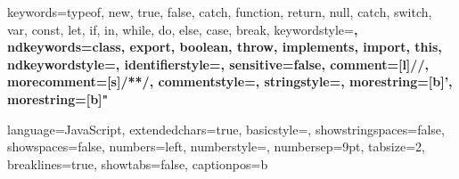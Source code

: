 {
  keywords={typeof, new, true, false, catch, function, return, null, catch, switch, var, const, let, if, in, while, do, else, case, break},
  keywordstyle=\color{myblue}\bfseries,
  ndkeywords={class, export, boolean, throw, implements, import, this},
  ndkeywordstyle=\color{darkgray}\bfseries,
  identifierstyle=\color{black},
  sensitive=false,
  comment=[l]{//},
  morecomment=[s]{/*}{*/},
  commentstyle=\color{mygreen}\ttfamily,
  stringstyle=\color{red}\ttfamily,
  morestring=[b]',
  morestring=[b]"
}




\lstset
{
   language=JavaScript,
   extendedchars=true,
   basicstyle=\footnotesize\listingsttfamily,
   showstringspaces=false,
   showspaces=false,
   numbers=left,
   numberstyle=\footnotesize,
   numbersep=9pt,
   tabsize=2,
   breaklines=true,
   showtabs=false,
   captionpos=b
}


\renewcommand\theFancyVerbLine{\footnotesize\arabic{FancyVerbLine}}
\newcommand{\inputmintedtesi}[3]{
    \begin{listing}[H]
      \inputminted[frame=single, %
                   framerule=0.0pt, %
                   rulecolor=mygray, %
                   framesep=2mm, %
                   baselinestretch=1.3, %
                   style=emacs, %
                   bgcolor=backcolor, %
                   fontfamily=courier, %
                   fontsize=\footnotesize, %
                   tabsize=2, %
                   linenos %
                  ]{#1}{#2}
       \label{lst:#3}
       \caption{#3}
    \end{listing}
   }
